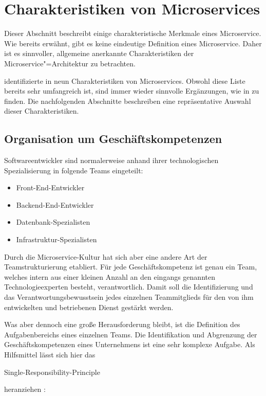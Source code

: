 \section{Charakteristiken von Microservices}
\label{sec:ms-characteristics}

Dieser Abschnitt beschreibt einige charakteristische Merkmale eines Microservice. Wie bereits erwähnt, gibt es keine eindeutige Definition eines Microservice. Daher ist es sinnvoller, allgemeine anerkannte Charakteristiken der Microservice"=Architektur zu betrachten.
 
\citeauthor{FowlerMS} identifizierte in \cite{FowlerMS} neun Charakteristiken von Microservices. Obwohl diese Liste bereits sehr umfangreich ist, sind immer wieder sinnvolle Ergänzungen, wie in \cite[3-9]{HorsdalMS} zu finden. Die nachfolgenden Abschnitte beschreiben eine repräsentative Auswahl dieser Charakteristiken.

\subsection{Organisation um Geschäftskompetenzen}
\label{sec:business-capabilities}

Softwareentwickler sind normalerweise anhand ihrer technologischen Spezialisierung \zB in folgende Teams eingeteilt:

\begin{itemize}
	\item Front-End-Entwickler
	\item Backend-End-Entwickler
	\item Datenbank-Spezialisten
	\item Infrastruktur-Spezialisten
\end{itemize}

Durch die Microservice-Kultur hat sich aber eine andere Art der Teamstrukturierung etabliert. Für jede Geschäftskompetenz ist genau ein Team, welches intern aus einer kleinen Anzahl an den eingangs genannten Technologieexperten besteht, verantwortlich. Damit soll die Identifizierung und das Verantwortungsbewusstsein jedes einzelnen Teammitglieds für den von ihm entwickelten und betriebenen Dienst gestärkt werden.

Was aber dennoch eine große Herausforderung bleibt, ist die Definition des Aufgabenbereichs eines einzelnen Teams. Die Identifikation und Abgrenzung der Geschäftskompetenzen eines Unternehmens ist eine sehr komplexe Aufgabe. Als Hilfsmittel lässt sich hier das \begin{english} Single-Responsibility-Principle\end{english} heranziehen \cite[116]{MartinAgile}: 

